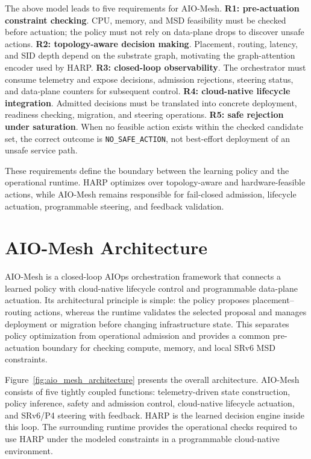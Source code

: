 \documentclass[final,5p]{elsarticle}
\newcommand{\rev}[1]{\textcolor{revisiongreen}{#1}}
\let\newrev\rev
\begin{document}
The above model leads to five requirements for AIO-Mesh. \textbf{R1: pre-actuation constraint checking}. CPU, memory, and MSD feasibility must be checked before actuation; the policy must not rely on data-plane drops to discover unsafe actions. \textbf{R2: topology-aware decision making}. Placement, routing, latency, and SID depth depend on the substrate graph, motivating the graph-attention encoder used by HARP. \textbf{R3: closed-loop observability}. The orchestrator must consume telemetry and expose decisions, admission rejections, steering status, and data-plane counters for subsequent control. \textbf{R4: cloud-native lifecycle integration}. Admitted decisions must be translated into concrete deployment, readiness checking, migration, and steering operations. \textbf{R5: safe rejection under saturation}. When no feasible action exists \rev{within the checked candidate set}, the correct outcome is \texttt{NO\_SAFE\_ACTION}, not best-effort deployment of an unsafe service path.

These requirements define the boundary between the learning policy and the operational runtime. HARP optimizes over topology-aware and hardware-feasible actions, while AIO-Mesh remains responsible for fail-closed admission, lifecycle actuation, programmable steering, and feedback validation.

\section{AIO-Mesh Architecture}
\label{sec:architecture}

AIO-Mesh is a closed-loop AIOps orchestration framework that connects a learned policy with cloud-native lifecycle control and programmable data-plane actuation. Its architectural principle is simple: \rev{the policy proposes placement--routing actions, whereas the runtime validates the selected proposal and manages deployment or migration before changing infrastructure state}. This separates policy optimization from operational admission and \rev{provides a common pre-actuation boundary for checking compute, memory, and local SRv6 MSD constraints}.

\newrev{Figure~\ref{fig:aio_mesh_architecture} presents the overall architecture.} AIO-Mesh consists of five tightly coupled functions: telemetry-driven state construction, policy inference, safety and admission control, cloud-native lifecycle actuation, and SRv6/P4 steering with feedback. HARP is the learned decision engine inside this loop. The surrounding runtime provides the operational \rev{checks} required to use HARP \rev{under the modeled constraints} in a programmable cloud-native environment.
\end{document}
